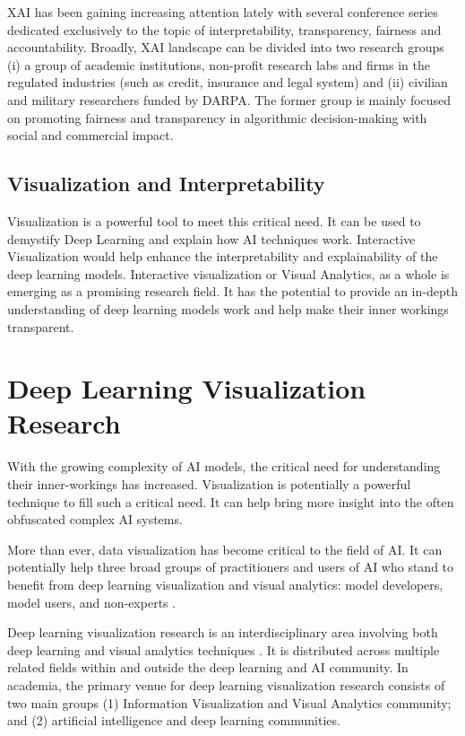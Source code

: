 XAI has been gaining increasing attention lately with several conference series dedicated exclusively to the topic of interpretability, transparency, fairness and accountability. Broadly, XAI landscape can be divided into two research groups (i) a group of academic institutions, non-profit research labs and firms in the regulated industries (such as credit, insurance and legal system) and (ii) civilian and military researchers funded by DARPA. The former group is mainly focused on promoting fairness and transparency in algorithmic decision-making with social and commercial impact.

\subsection{Visualization and Interpretability}

Visualization is a powerful tool to meet this critical need. It can be used to demystify Deep Learning and explain how AI techniques work. Interactive Visualization would help enhance the interpretability and explainability of the deep learning models. Interactive visualization or Visual Analytics, as a whole is emerging as a promising research field. It has the potential to provide an in-depth understanding of deep learning models work and help make their inner workings transparent.

\section{Deep Learning Visualization Research}

With the growing complexity of AI models, the critical need for understanding their inner-workings has increased. Visualization is potentially a powerful technique to fill such a critical need. It can help bring more insight into the often obfuscated complex AI systems.

More than ever, data visualization has become critical to the field of AI. It can potentially help three broad groups of practitioners and users of AI who stand to benefit from deep learning visualization and visual analytics: model developers, model users, and non-experts \cite{Choo2018}.

Deep learning visualization research is an interdisciplinary area involving both deep learning and visual analytics techniques \cite{Choo2018}. It is distributed across multiple related fields within and outside the deep learning and AI community. In academia, the primary venue for deep learning visualization research consists of two main groups (1) Information Visualization and Visual Analytics community; and (2) artificial intelligence and deep learning communities. 

